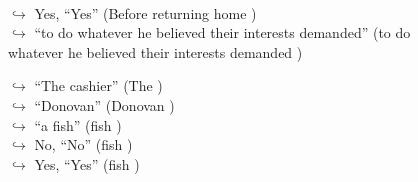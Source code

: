 \documentclass[11pt,a4paper, onecolumn]{article}
\begin{document}
\begin{figure}[t]
\begin{tcolorbox}[boxsep=0pt,left=5pt,right=0pt,top=2pt,colback = yellow!5]
\begin{dialogue}
\\
\colorbox{pink!25}{$\hookrightarrow$}
\colorbox{red!25}{Yes,}
{ ``Yes'' (Before returning home ) }
\\
\colorbox{pink!25}{$\hookrightarrow$}
{ ``to do whatever he believed their interests demanded'' (to do whatever he believed their interests demanded ) }
\\
 \end{dialogue}\end{tcolorbox}\end{figure}\begin{figure}[t] \small \begin{tcolorbox}[boxsep=0pt,left=5pt,right=0pt,top=2pt,colback = yellow!5] \begin{dialogue}
 \small 
\colorbox{pink!25}{$\hookrightarrow$}
{ ``The cashier'' (The ) }
\\
\colorbox{pink!25}{$\hookrightarrow$}
{ ``Donovan'' (Donovan ) }
\\
\colorbox{pink!25}{$\hookrightarrow$}
{ ``a fish'' (fish ) }
\\
\colorbox{pink!25}{$\hookrightarrow$}
\colorbox{red!25}{No,}
{ ``No'' (fish ) }
\\
\colorbox{pink!25}{$\hookrightarrow$}
\colorbox{red!25}{Yes,}
{ ``Yes'' (fish ) }
\\
 \end{dialogue}\end{tcolorbox}\end{figure}
\end{document}
